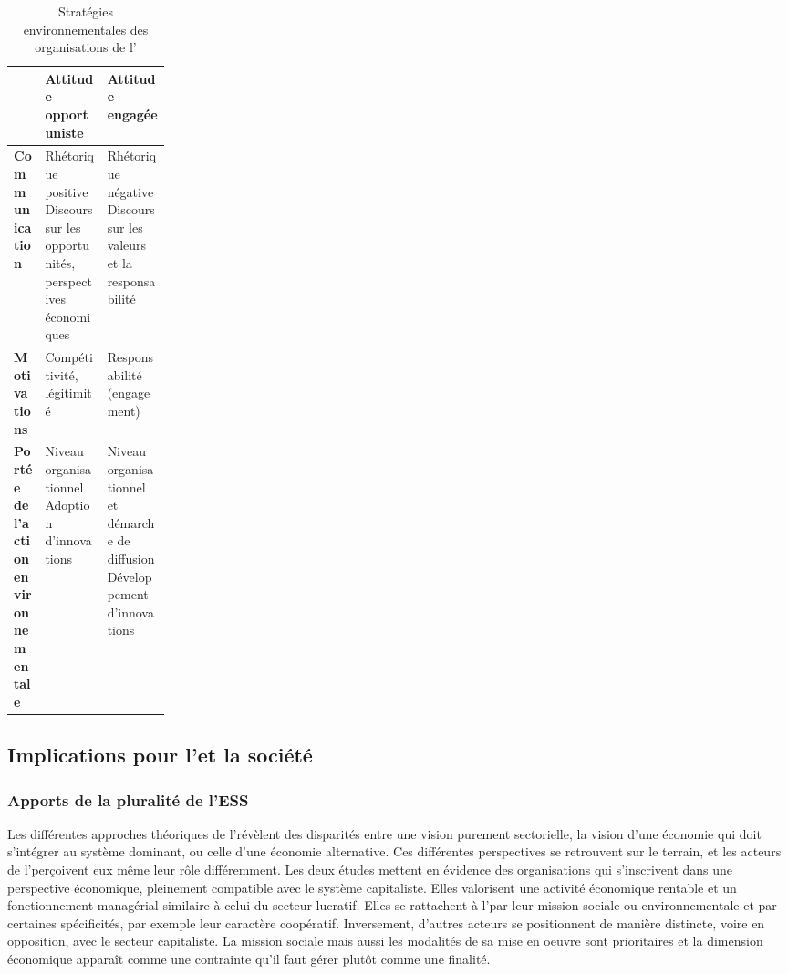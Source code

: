         \begin{table}[]
          \centering
          \caption{Stratégies environnementales des organisations de l'\ess}
          \label{table:strategiesenvir}
              \begin{tabularx}{\linewidth}{|K{0.205\linewidth}|X|X|}
                  \hline
                   & \textbf{Attitude opportuniste} & \textbf{Attitude engagée} \\ \hline

                  \textbf{Communication}
                      & Rhétorique positive \newline Discours sur les opportunités, perspectives économiques
                      & Rhétorique négative \newline Discours sur les valeurs et la responsabilité \\ \hline

                  \textbf{Motivations}
                      & Compétitivité, légitimité
                      & Responsabilité (engagement) \\ \hline

                  \textbf{Portée de l'action environnementale }
                      & Niveau organisationnel \newline Adoption d'innovations
                      & Niveau organisationnel et démarche de diffusion \newline Développement d'innovations\\ \hline

              \end{tabularx}
          \end{table}

    \subsection{Implications pour l'\ess et la société}
        \subsubsection{Apports de la pluralité de l'ESS}
        Les différentes approches théoriques de l'\ess révèlent des disparités entre une vision purement sectorielle, la vision d'une économie qui doit s'intégrer au système dominant, ou celle d'une économie alternative. Ces différentes perspectives se retrouvent sur le terrain, et les acteurs de l'\ess perçoivent eux même leur rôle différemment. Les deux études mettent en évidence des organisations qui s'inscrivent dans une perspective économique, pleinement compatible avec le système capitaliste. Elles valorisent une activité économique rentable et un fonctionnement managérial similaire à celui du secteur lucratif. Elles se rattachent à l'\ess par leur mission sociale ou environnementale et par certaines spécificités, par exemple leur caractère coopératif. Inversement, d'autres acteurs se positionnent de manière distincte, voire en opposition, avec le secteur capitaliste. La mission sociale mais aussi les modalités de sa mise en oeuvre sont prioritaires et la dimension économique apparaît comme une contrainte qu'il faut gérer plutôt comme une finalité. \\

